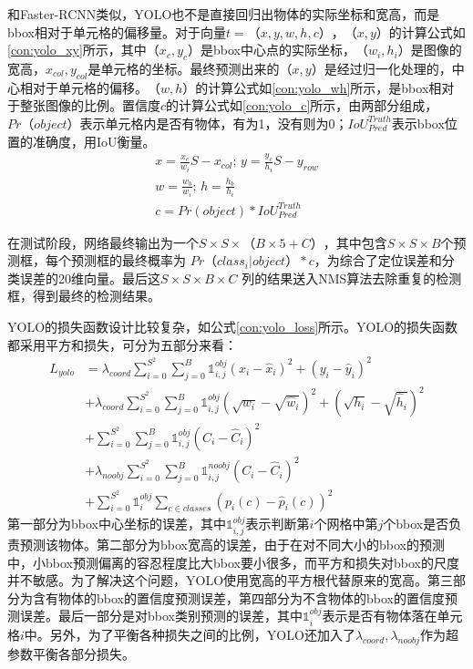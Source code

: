 和Faster-RCNN类似，YOLO也不是直接回归出物体的实际坐标和宽高，而是bbox相对于单元格的偏移量。对于向量$t=（x,y,w,h,c）$，$（x,y）$的计算公式如\ref{con:yolo_xy}所示，其中$（x_c,y_c）$是bbox中心点的实际坐标，$（w_i, h_i）$是图像的宽高，$x_{col}, y_{col}$是单元格的坐标。最终预测出来的$（x,y）$是经过归一化处理的，中心相对于单元格的偏移。$（w,h）$的计算公式如\ref{con:yolo_wh}所示，是bbox相对于整张图像的比例。置信度$c$的计算公式如\ref{con:yolo_c}所示，由两部分组成，$Pr（object）$表示单元格内是否有物体，有为1，没有则为0；$IoU^{Truth}_{Pred}$表示bbox位置的准确度，用IoU衡量。
\begin{gather}
x = \frac{x_c}{w_i}S - x_{col}; \, y = \frac{y_c}{h_i}S - y_{row} 
\label{con:yolo_xy}\\
w = \frac{w_b}{w_i}; \, h = \frac{h_b}{h_i}
\label{con:yolo_wh}\\
c = Pr(object)*IoU^{Truth}_{Pred}
\label{con:yolo_c}
\end{gather}

在测试阶段，网络最终输出为一个$S \times S \times （B \times 5 + C）$，其中包含$S \times S \times B$个预测框，每个预测框的最终概率为 $Pr（class_i|object） * c$，为综合了定位误差和分类误差的20维向量。最后这$S \times S \times B \times C$ 列的结果送入NMS算法去除重复的检测框，得到最终的检测结果。

YOLO的损失函数设计比较复杂，如公式\ref{con:yolo_loss}所示。YOLO的损失函数都采用平方和损失，可分为五部分来看：
\begin{equation}
\begin{split}
L_{yolo} &= \lambda_{coord} \sum^{S^2}_{i=0} \sum^{B}_{j=0} \mathds{1}^{obj}_{i,j} (x_i - \hat{x}_i)^2 + (y_i - \hat{y}_i)^2 \\
&+ \lambda_{coord} \sum^{S^2}_{i=0} \sum^{B}_{j=0} \mathds{1}^{obj}_{i,j} \left(\sqrt{w_i} - \sqrt{\hat{w}_i}\right)^2 + \left(\sqrt{h_i} - \sqrt{\hat{h}_i}\right)^2 \\
&+ \sum^{S^2}_{i=0} \sum^{B}_{j=0} \mathds{1}^{obj}_{i,j}\left(C_i -\hat{C}_i\right)^2\\
&+ \lambda_{noobj} \sum^{S^2}_{i=0} \sum^{B}_{j=0} \mathds{1}^{noobj}_{i,j}\left(C_i -\hat{C}_i\right)^2\\
&+ \sum^{S^2}_{i=0}\mathds{1}^{obj}_{i}\sum_{c \in classes} \left(p_i(c) - \hat{p}_i(c)\right)^2
\end{split}
\label{con:yolo_loss}
\end{equation}
第一部分为bbox中心坐标的误差，其中$\mathds{1}^{obj}_{i,j}$表示判断第$i$个网格中第$j$个bbox是否负责预测该物体。第二部分为bbox宽高的误差，由于在对不同大小的bbox的预测中，小bbox预测偏离的容忍程度比大bbox要小很多，而平方和损失对bbox的尺度并不敏感。为了解决这个问题，YOLO使用宽高的平方根代替原来的宽高。第三部分为含有物体的bbox的置信度预测误差，第四部分为不含物体的bbox的置信度预测误差。最后一部分是对bbox类别预测的误差，其中$\mathds{1}^{obj}_{i}$表示是否有物体落在单元格$i$中。另外，为了平衡各种损失之间的比例，YOLO还加入了$\lambda_{coord}, \lambda_{noobj}$作为超参数平衡各部分损失。

